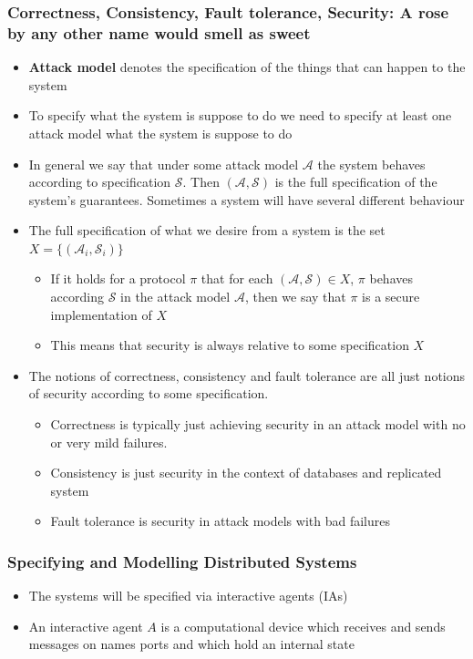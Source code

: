 \documentclass[11pt]{article}
\begin{document}
\subsubsection{Correctness, Consistency, Fault tolerance, Security: A rose by any other name would smell as sweet}
\label{sec:orgb4a4d90}
\begin{itemize}
\item \textbf{Attack model} denotes the specification of the things that can happen to the system
\item To specify what the system is suppose to do we need to specify at least one attack model what the system is suppose to do
\item In general we say that under some attack model \(\mathcal{A}\) the system behaves according to specification \(\mathcal S\). Then \((\mathcal A, \mathcal S)\) is the full specification of the system’s guarantees. Sometimes a system will have several different behaviour

\item The full specification of what we desire from a system is the set \(X = \{(\mathcal A_i, \mathcal S_i)\}\)
\begin{itemize}
\item If it holds for a protocol \(\pi\) that for each \((\mathcal A, \mathcal S) \in X\), \(\pi\) behaves according \(\mathcal S\) in the attack model \(\mathcal A\), then we say that \(\pi\) is a secure implementation of \(X\)
\item This means that security is always relative to some specification \(X\)
\end{itemize}

\item The notions of correctness, consistency and fault tolerance are all just notions of security according to some specification.
\begin{itemize}
\item Correctness is typically just achieving security in an attack model with no or very mild failures.
\item Consistency is just security in the context of databases and replicated system
\item Fault tolerance is security in attack models with bad failures
\end{itemize}
\end{itemize}

\subsubsection{Specifying and Modelling Distributed Systems}
\label{sec:org432ca8e}
\begin{itemize}
\item The systems will be specified via interactive agents (IAs)
\item An interactive agent \(A\) is a computational device which receives and sends messages on names ports and which hold an internal state
\end{itemize}
\end{document}
